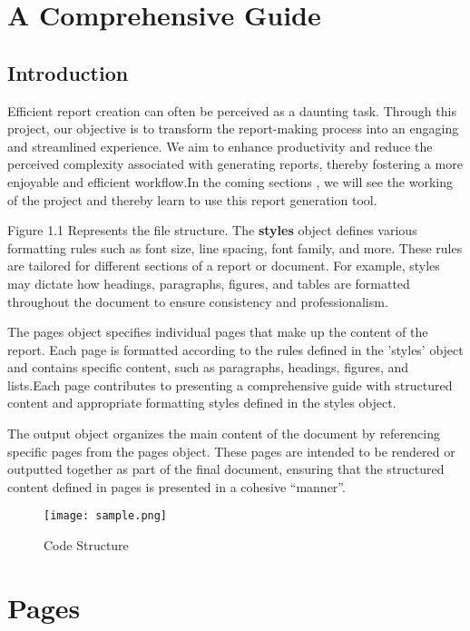 \documentclass[oneside]{book}
\begin{document}
\setcounter{page}{0}
\tableofcontents
\newpage\listoffigures
\clearpage
{}
\setcounter{page}{1}
\newpage
\chapter{A Comprehensive Guide}
\section{Introduction}
Efficient report creation can often be perceived as a daunting task. Through this project, our objective is to transform the report-making process
             into an engaging and streamlined experience. We aim to enhance productivity and reduce the perceived complexity associated with generating reports,
             thereby fostering a more enjoyable and efficient workflow.In the coming sections , we will see the working of the project and thereby learn to use this
              report generation tool.\par
Figure 1.1 Represents the file structure.
            The \textbf{styles} object defines various formatting rules such as font size, line spacing, font family, and more. These rules are tailored for different 
            sections of a report or document. For example, styles may dictate how headings, paragraphs, figures, and tables are formatted throughout the document 
            to ensure consistency and professionalism.\par
The pages object specifies individual pages that make up the content of the report. Each page is formatted according to the 
            rules defined in the 'styles' object and contains specific content, such as paragraphs, headings, figures, and lists.Each page contributes to presenting a 
            comprehensive guide with structured content and appropriate formatting styles defined in the styles object.\par
The output object organizes the main content of the document by referencing specific pages from the pages object.
            These pages are intended to be rendered or outputted together as part of the final document, ensuring that the structured content defined in pages is 
            presented in a cohesive ``manner''.\par
\begin{figure}[h]
\centering
\texttt{[image: sample.png]}
\caption{Code Structure}
\end{figure}
\newpage
\chapter{Pages}
\end{document}
